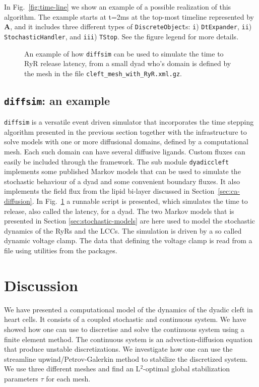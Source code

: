 In Fig.~\ref{fig:time-line} we show an example of a possible realization of this algorithm. The example starts at t=2ms at the top-most timeline represented by \textbf{A}, and it includes three different types of \texttt{DiscreteObject}s: \texttt{i}) \texttt{DtExpander}, \texttt{ii}) \texttt{StochasticHandler}, and \texttt{iii}) \texttt{TStop}. See the figure legend for more details.\par
\begin{figure}
  \centering
  \vspace{-1.5em}
  \caption{An example of how \texttt{diffsim} can be used to simulate the time to RyR release latency, from a small dyad who's domain is defined by the mesh in the file \texttt{cleft\_mesh\_with\_RyR.xml.gz}.}
  \label{fig:diffsim_test}
\end{figure}

\subsection*{\texttt{diffsim}: an example}
\texttt{diffsim} is a versatile event driven simulator that incorporates the time stepping algorithm presented in the previous section together with the infrastructure to solve models with one or more diffusional domains, defined by a computational mesh. Each such domain can have several diffusive ligands. Custom fluxes can easily be included through the framework. The sub module \texttt{dyadiccleft} implements some published Markov models that can be used to simulate the stochastic behaviour of a dyad and some convenient boundary fluxes. It also implements the field flux from the lipid bi-layer discussed in Section~\ref{sec:ca-diffusion}. In Fig.~\ref{fig:diffsim_test} a runnable script is presented, which simulates the time to release, also called the latency, for a dyad. The two Markov models that is presented in Section \ref{sec:stochastic-models} are here used to model the stochastic dynamics of the RyRs and the LCCs. The simulation is driven by a so called dynamic voltage clamp. The data that defining the voltage clamp is read from a file using utilities from the \numpy \python packages.\par

\section{Discussion}
We have presented a computational model of the \Ca dynamics of the dyadic cleft in heart cells. It consists of a coupled stochastic and continuous system. We have showed how one can use \pydolfin to discretise and solve the continuous system using a finite element method. The continuous system is an advection-diffusion equation that produce unstable discretizations. We investigate how one can use the streamline upwind/Petrov-Galerkin method to stabilize the discretized system. We use three different meshes and find an L$^2$-optimal global stabilization parameters $\tau$ for each mesh.\par


